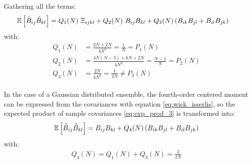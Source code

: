 \documentclass[12pt]{scrartcl}
\begin{document}
Gathering all the terms:
\begin{align}
\label{eq:exp_prod_3}
\mathbb{E} \left[\accentset{\circ}{B}_{ij} \accentset{\circ}{B}_{kl}\right] & = Q_1(N) \ \Xi_{ijkl} + Q_2(N) \ B_{ij} B_{kl} + Q_3(N) \left(B_{ik} B_{jl} + B_{il} B_{jk}\right)
\end{align}
with:
\begin{subequations}
\begin{align}
Q_1(N) & = \frac{2N+2N}{4N^2} = \frac{1}{N} = P_1(N)\\
Q_2(N) & = \frac{4N(N-3)+6N+2N}{4N^2} = \frac{N-1}{N} = P_2(N)\\
Q_3(N) & = \frac{2N}{4N^2} = \frac{1}{2N} \ne P_3(N)
\end{align}
\end{subequations}
$  $\\
In the case of a Gaussian distributed ensemble, the fourth-order centered moment can be expressed from the covariances with equation \eqref{eq:wick_isserlis}, so the expected product of sample covariances \eqref{eq:exp_prod_3} is transformed into:
\begin{align}
\label{eq:exp_prod_gau_3}
\mathbb{E} \left[\accentset{\circ}{B}_{ij} \accentset{\circ}{B}_{kl}\right] = B_{ij} B_{kl} + Q_4(N) \left(B_{ik} B_{jl} + B_{il} B_{jk}\right)
\end{align}
with:
\begin{align}
Q_4(N) = Q_1(N) + Q_3(N) = \frac{3}{2N}
\end{align}
\end{document}
